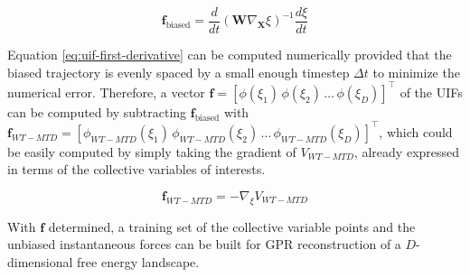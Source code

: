 \begin{spacing}{2.0}
    \begin{equation}
        \mathbf{f}_{\mathrm{biased}} = \frac{d}{dt}(\mathbf{W}\nabla_{\mathbf{X}}\xi)^{-1}\frac{d\xi}{dt}
        \label{eq:uif-first-derivative}
    \end{equation}

    Equation \ref{eq:uif-first-derivative} can be computed numerically provided that the biased trajectory is evenly spaced by a small enough 
    timestep $\Delta t$ to minimize the numerical error. Therefore, a vector $\mathbf{f} = \left[\phi(\xi_1)\,\phi(\xi_2)
    \,\ldots\,\phi(\xi_D)\right]^{\top}$ of the UIFs can be computed by subtracting $\mathbf{f}_{\mathrm{biased}}$ with
    $\mathbf{f}_{WT-MTD} = \left[\phi_{WT-MTD}(\xi_1)\,\phi_{WT-MTD}(\xi_2)\,\ldots\,\phi_{WT-MTD}(\xi_D)\right]^{\top}$, which could be
    easily computed by simply taking the gradient of $V_{WT-MTD}$, already expressed in terms of the collective variables of interests.

    \begin{equation}
        \mathbf{f}_{WT-MTD} = -\nabla_{\xi}V_{WT-MTD}
    \end{equation}

    With $\mathbf{f}$ determined, a training set of the collective variable points and the unbiased instantaneous forces can be built for
    GPR reconstruction of a $D$-dimensional free energy landscape. 
\end{spacing}
